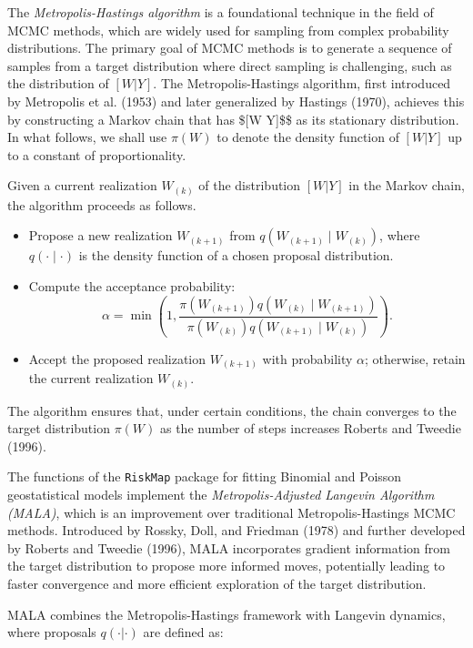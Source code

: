 \documentclass[
  letterpaper,
]{krantz}
\providecommand{\tightlist}{%
  \setlength{\itemsep}{0pt}\setlength{\parskip}{0pt}}\usepackage{longtable,booktabs,array}
\begin{document}
The \textit{Metropolis-Hastings algorithm} is a foundational technique
in the field of MCMC methods, which are widely used for sampling from
complex probability distributions. The primary goal of MCMC methods is
to generate a sequence of samples from a target distribution where
direct sampling is challenging, such as the distribution of \([W | Y]\).
The Metropolis-Hastings algorithm, first introduced by Metropolis et al.
(1953) and later generalized by Hastings (1970), achieves this by
constructing a Markov chain that has \${[}W \textbar{} Y{]}\$\$ as its
stationary distribution. In what follows, we shall use \(\pi(W)\) to
denote the density function of \([W | Y]\) up to a constant of
proportionality.

Given a current realization \(W_{(k)}\) of the distribution \([W | Y]\)
in the Markov chain, the algorithm proceeds as follows.

\begin{itemize}
\tightlist
\item
  Propose a new realization \(W_{(k+1)}\) from
  \(q(W_{(k+1)} \mid W_{(k)})\), where \(q(\cdot \mid \cdot)\) is the
  density function of a chosen proposal distribution.
\item
  Compute the acceptance probability: \[
  \alpha = \min \left(1, \frac{\pi(W_{(k+1)}) q(W_{(k)} \mid W_{(k+1)})}{\pi(W_{(k)}) q(W_{(k+1)} \mid W_{(k)})} \right).
  \]
\item
  Accept the proposed realization \(W_{(k+1)}\) with probability
  \(\alpha\); otherwise, retain the current realization \(W_{(k)}\).
\end{itemize}

The algorithm ensures that, under certain conditions, the chain
converges to the target distribution \(\pi(W)\) as the number of steps
increases Roberts and Tweedie (1996).

The functions of the \texttt{RiskMap} package for fitting Binomial and
Poisson geostatistical models implement the
\textit{Metropolis-Adjusted Langevin Algorithm (MALA)}, which is an
improvement over traditional Metropolis-Hastings MCMC methods.
Introduced by Rossky, Doll, and Friedman (1978) and further developed by
Roberts and Tweedie (1996), MALA incorporates gradient information from
the target distribution to propose more informed moves, potentially
leading to faster convergence and more efficient exploration of the
target distribution.

MALA combines the Metropolis-Hastings framework with Langevin dynamics,
where proposals \(q(\cdot | \cdot)\) are defined as:
\end{document}
